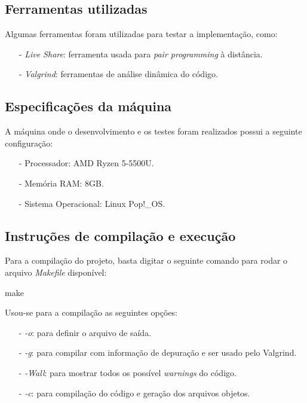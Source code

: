 \documentclass{article}
\begin{document}
\subsection{Ferramentas utilizadas}
Algumas ferramentas foram utilizadas para testar a implementação, como:
\begin{itemize}
\item[-] \textit{Live Share}: ferramenta usada para \textit{pair programming} à distância.
\item[-] \textit{Valgrind}: ferramentas de análise dinâmica do código.
\end{itemize}

\subsection{Especificações da máquina}
A máquina onde o desenvolvimento e os testes foram realizados possui a seguinte configuração:
\begin{itemize}
   \item[-] Processador: AMD Ryzen 5-5500U.
	\item[-] Memória RAM: 8GB.
              \item[-] Sistema Operacional: Linux Pop!\_OS.
\end{itemize}

\subsection{Instruções de compilação e execução}

Para a compilação do projeto, basta digitar o seguinte comando para rodar o arquivo \textit{Makefile} disponível:

\begin{tcolorbox}[title=Compilando o projeto,width=\linewidth]
    make
\end{tcolorbox}

Usou-se para a compilação as seguintes opções:
\begin{itemize}
    \item [-] \emph{-o}: para definir o arquivo de saída.
    \item [-] \emph{-g}: para compilar com informação de depuração e ser usado pelo Valgrind.
    \item [-] \emph{-Wall}: para mostrar todos os possível \emph{warnings} do código.
    \item [-] \emph{-c}: para compilação do código e geração dos arquivos objetos.
\end{itemize}
\end{document}
